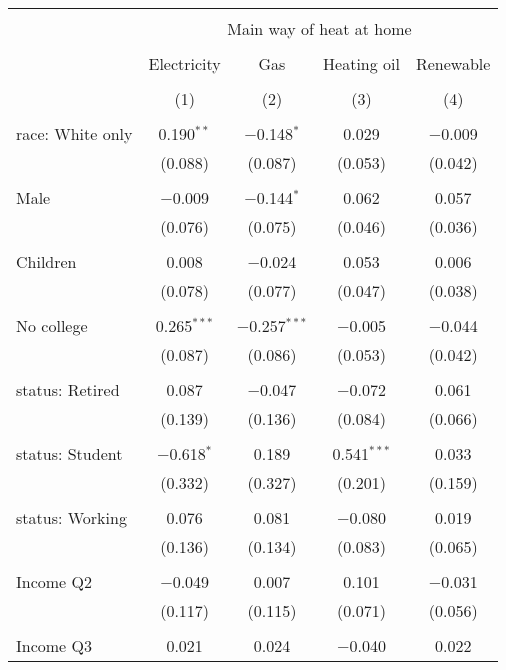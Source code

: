 
\begin{tabular}{@{\extracolsep{5pt}}lcccc} 
\\[-1.8ex]\hline 
\hline \\[-1.8ex] 
 & \multicolumn{4}{c}{Main way of heat at home} \\ 
\cline{2-5} 
\\[-1.8ex] & Electricity & Gas & Heating oil & Renewable \\ 
\\[-1.8ex] & (1) & (2) & (3) & (4)\\ 
\hline \\[-1.8ex] 
 race: White only & 0.190$^{**}$ & $-$0.148$^{*}$ & 0.029 & $-$0.009 \\ 
  & (0.088) & (0.087) & (0.053) & (0.042) \\ 
  & & & & \\ 
 Male & $-$0.009 & $-$0.144$^{*}$ & 0.062 & 0.057 \\ 
  & (0.076) & (0.075) & (0.046) & (0.036) \\ 
  & & & & \\ 
 Children & 0.008 & $-$0.024 & 0.053 & 0.006 \\ 
  & (0.078) & (0.077) & (0.047) & (0.038) \\ 
  & & & & \\ 
 No college & 0.265$^{***}$ & $-$0.257$^{***}$ & $-$0.005 & $-$0.044 \\ 
  & (0.087) & (0.086) & (0.053) & (0.042) \\ 
  & & & & \\ 
 status: Retired & 0.087 & $-$0.047 & $-$0.072 & 0.061 \\ 
  & (0.139) & (0.136) & (0.084) & (0.066) \\ 
  & & & & \\ 
 status: Student & $-$0.618$^{*}$ & 0.189 & 0.541$^{***}$ & 0.033 \\ 
  & (0.332) & (0.327) & (0.201) & (0.159) \\ 
  & & & & \\ 
 status: Working & 0.076 & 0.081 & $-$0.080 & 0.019 \\ 
  & (0.136) & (0.134) & (0.083) & (0.065) \\ 
  & & & & \\ 
 Income Q2 & $-$0.049 & 0.007 & 0.101 & $-$0.031 \\ 
  & (0.117) & (0.115) & (0.071) & (0.056) \\ 
  & & & & \\ 
 Income Q3 & 0.021 & 0.024 & $-$0.040 & 0.022 \\ 

\end{tabular}

